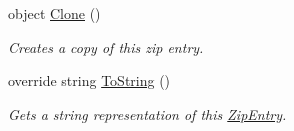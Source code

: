 \begin{DoxyCompactItemize}
object \hyperlink{class_i_c_sharp_code_1_1_sharp_zip_lib_1_1_zip_1_1_zip_entry_a475643d6fac14598ae4b1214c20b2229}{Clone} ()
\begin{DoxyCompactList}\small\item\em Creates a copy of this zip entry. \end{DoxyCompactList}\item 
override string \hyperlink{class_i_c_sharp_code_1_1_sharp_zip_lib_1_1_zip_1_1_zip_entry_a0cd045443176515f91c959537d8c8b51}{To\+String} ()
\begin{DoxyCompactList}\small\item\em Gets a string representation of this \hyperlink{class_i_c_sharp_code_1_1_sharp_zip_lib_1_1_zip_1_1_zip_entry}{Zip\+Entry}. \end{DoxyCompactList}\end{DoxyCompactItemize}
